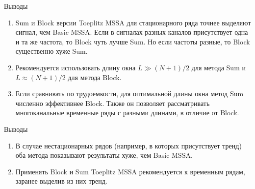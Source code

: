 \documentclass[ucs, notheorems, handout]{beamer}
\newcounter{saveenumi}
\newcommand{\seti}{\setcounter{saveenumi}{\value{enumi}}}
\newcommand{\conti}{\setcounter{enumi}{\value{saveenumi}}}
\begin{document}
\begin{frame}{Выводы}
	\begin{enumerate}
		\item Sum и Block версии Toeplitz MSSA для стационарного ряда точнее выделяют сигнал, чем Basic MSSA. Если в сигналах разных каналов присутствует одна и та же частота, то Block чуть лучше Sum. Но если частоты разные, то Block существенно хуже Sum.\medskip
		\item Рекомендуется использовать длину окна $L\gg(N+1)/2$ для метода Sum и $L\approx (N+1)/2$ для метода Block.\medskip
		\item Если сравнивать по трудоемкости, для оптимальной длины окна метод Sum численно эффективнее Block. Также он позволяет рассматривать многоканальные временные ряды с разными длинами, в отличие от Block.
		\seti
	\end{enumerate}
\end{frame}
\begin{frame}{Выводы}
	\begin{enumerate}
		\conti
		\item В случае нестационарных рядов (например, в которых присутствует тренд) оба метода показывают результаты хуже, чем Basic MSSA.\medskip
		\item Применять Block и Sum Toeplitz MSSA рекомендуется к временным рядам, заранее выделив из них тренд.\medskip
	\end{enumerate}
\end{frame}
\end{document}
